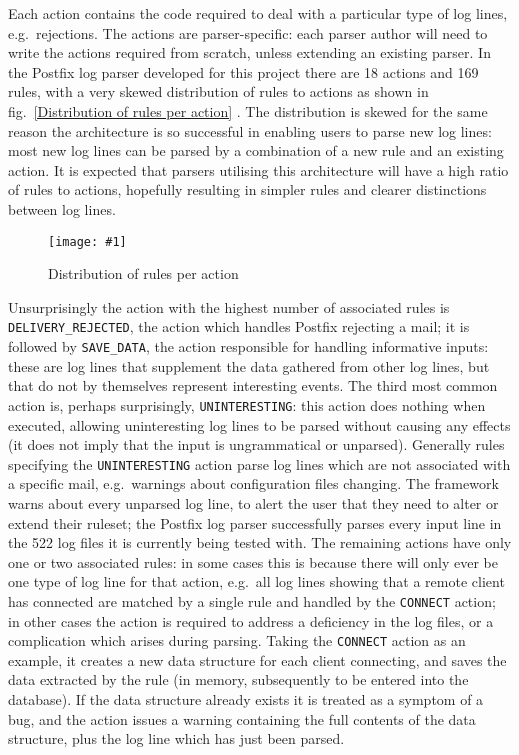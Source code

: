 \documentclass[draft]{svmult}
\newcommand{\showgraph}[3]{%
    \begin{figure}[hbtp]%
        \caption{#2}\label{#3}%
        \texttt{[image: \#1]}%
    \end{figure}%
}
\newcommand{\refwithlabel}[2]{%
    #1~\vref{#2}%
}
\newcommand{\graphref}[1]{%
    \refwithlabel{fig.}{#1}%
}
\newcommand{\numberOFrules}[0]{%
    169%
}
\newcommand{\numberOFlogFILESall}[0]{%
    522%
}
\newcommand{\numberOFactions}[0]{%
    18%
}
\begin{document}
Each action contains the code required to deal with a particular type of
log lines, e.g.\ rejections.  The actions are parser-specific: each parser
author will need to write the actions required from scratch, unless
extending an existing parser.  In the Postfix log parser developed for this
project there are \numberOFactions{} actions and \numberOFrules{} rules,
with a very skewed distribution of rules to actions as shown in
\graphref{Distribution of rules per action}.  The distribution is skewed
for the same reason the architecture is so successful in enabling users to
parse new log lines: most new log lines can be parsed by a combination of a
new rule and an existing action.  It is expected that parsers utilising
this architecture will have a high ratio of rules to actions, hopefully
resulting in simpler rules and clearer distinctions between log lines.
\showgraph{build/graph-action-distribution}{Distribution of rules per
action}{Distribution of rules per action} Unsurprisingly the action with
the highest number of associated rules is \texttt{DELIVERY\_REJECTED}, the
action which handles Postfix rejecting a mail; it is followed by
\texttt{SAVE\_DATA}, the action responsible for handling informative
inputs: these are log lines that supplement the data gathered from other
log lines, but that do not by themselves represent interesting events.  The
third most common action is, perhaps surprisingly, \texttt{UNINTERESTING}:
this action does nothing when executed, allowing uninteresting log lines to
be parsed without causing any effects (it does not imply that the input is
ungrammatical or unparsed).  Generally rules specifying the
\texttt{UNINTERESTING} action parse log lines which are not associated with
a specific mail, e.g.\ warnings about configuration files changing.  The
framework warns about every unparsed log line, to alert the user that they
need to alter or extend their ruleset; the Postfix log parser successfully
parses every input line in the \numberOFlogFILESall{} log files it is
currently being tested with.  The remaining actions have only one or two
associated rules: in some cases this is because there will only ever be one
type of log line for that action, e.g.\ all log lines showing that a remote
client has connected are matched by a single rule and handled by the
\texttt{CONNECT} action; in other cases the action is required to address a
deficiency in the log files, or a complication which arises during parsing.
Taking the \texttt{CONNECT} action as an example, it creates a new data
structure for each client connecting, and saves the data extracted by the
rule (in memory, subsequently to be entered into the database).  If the
data structure already exists it is treated as a symptom of a bug, and the
action issues a warning containing the full contents of the data structure,
plus the log line which has just been parsed.
\end{document}

